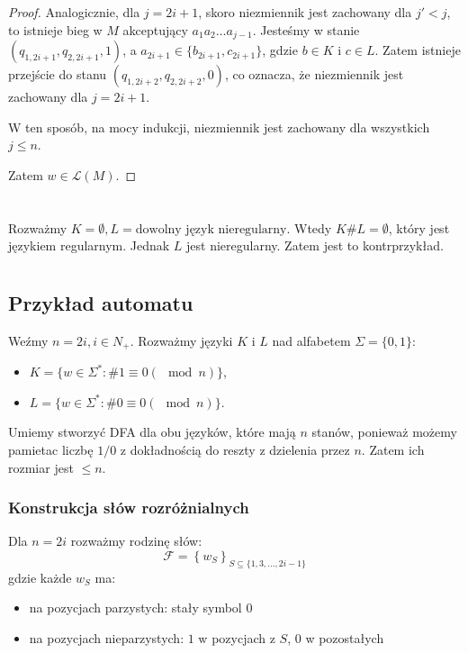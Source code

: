\documentclass{article}
\theoremstyle{definition}
\theoremstyle{remark}
\begin{document}
\begin{proof}
    Analogicznie, dla \(j = 2i+1\), skoro niezmiennik jest zachowany dla \(j'<j\), to istnieje bieg w \(M\) akceptujący \(a_1 a_2 \ldots a_{j-1}\). 
    Jesteśmy w stanie \(\left(q_{1,2i+1}, q_{2,2i+1}, 1 \right)\), a \(a_{2i+1} \in \{b_{2i+1}, c_{2i+1}\}\), gdzie \(b \in K\) i \(c \in L\). 
    Zatem istnieje przejście do stanu \(\left(q_{1,2i+2}, q_{2,2i+2}, 0 \right)\), co oznacza, że niezmiennik jest zachowany dla \(j = 2i+1\).

    W ten sposób, na mocy indukcji, niezmiennik jest zachowany dla wszystkich \(j \leq n\).


    Zatem \(w \in \mathcal{L}(M)\).
\end{proof}

\section{}

Rozważmy \(K = \emptyset, L = \text{dowolny język nieregularny}\). Wtedy
\(K \# L = \emptyset\), który jest językiem regularnym. Jednak \(L\)
jest nieregularny. Zatem jest to kontrprzykład.

\section{}

\subsection{Przykład automatu}

Weźmy \(n = 2i, i \in N_+\).
Rozważmy języki \(K\) i \(L\) nad alfabetem \(\Sigma = \{0, 1\}\):
\begin{itemize}
    \item \(K = \{ w \in \Sigma^* : \# 1 \equiv 0 (\mod n) \}\),
    \item \(L = \{ w \in \Sigma^* : \# 0 \equiv 0 (\mod n) \}\).
\end{itemize}

Umiemy stworzyć DFA dla obu języków, które mają \(n\) stanów,
ponieważ możemy pamietac liczbę \(1/0\) z dokładnością do reszty z dzielenia przez \(n\).
Zatem ich rozmiar jest \(\leq n\).

\subsubsection{Konstrukcja słów rozróżnialnych}
Dla $n = 2i$ rozważmy rodzinę słów:
\[
\mathcal{F} = \left\{ w_S \right\} _{S \subseteq \{1,3,\dots,2i-1\}}
\]
gdzie każde $w_S$ ma:
\begin{itemize}
    \item na pozycjach parzystych: stały symbol $0$
    \item na pozycjach nieparzystych: $1$ w pozycjach z $S$, $0$ w pozostałych
\end{itemize}
\end{document}

